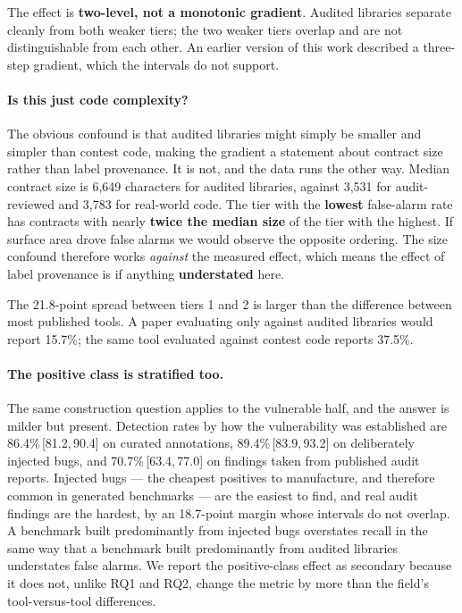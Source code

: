 \documentclass[sigconf,nonacm]{acmart}
\newcommand{\ci}[2]{\,[#1,\,#2]}
\begin{document}
The effect is \textbf{two-level, not a monotonic gradient}. Audited libraries
separate cleanly from both weaker tiers; the two weaker tiers overlap and are not
distinguishable from each other. An earlier version of this work described a
three-step gradient, which the intervals do not support.

\paragraph{Is this just code complexity?}
The obvious confound is that audited libraries might simply be smaller and
simpler than contest code, making the gradient a statement about contract size
rather than label provenance. It is not, and the data runs the other way. Median
contract size is 6,649 characters for audited libraries, against 3,531 for
audit-reviewed and 3,783 for real-world code. The tier with the \textbf{lowest}
false-alarm rate has contracts with nearly \textbf{twice the median size} of the
tier with the highest. If surface area drove false alarms we would observe the
opposite ordering. The size confound therefore works \emph{against} the measured
effect, which means the effect of label provenance is if anything
\textbf{understated} here.

The 21.8-point spread between tiers 1 and 2 is larger than the difference between
most published tools. A paper evaluating only against audited libraries would
report 15.7\%; the same tool evaluated against contest code reports 37.5\%.

\paragraph{The positive class is stratified too.}
The same construction question applies to the vulnerable half, and the answer is
milder but present. Detection rates by how the vulnerability was established are
86.4\%\ci{81.2}{90.4} on curated annotations, 89.4\%\ci{83.9}{93.2} on
deliberately injected bugs, and 70.7\%\ci{63.4}{77.0} on findings taken from
published audit reports. Injected bugs --- the cheapest positives to manufacture,
and therefore common in generated benchmarks --- are the easiest to find, and real
audit findings are the hardest, by an 18.7-point margin whose intervals do not
overlap. A benchmark built predominantly from injected bugs overstates recall in
the same way that a benchmark built predominantly from audited libraries
understates false alarms. We report the positive-class effect as secondary because
it does not, unlike RQ1 and RQ2, change the metric by more than the field's
tool-versus-tool differences.
\end{document}
